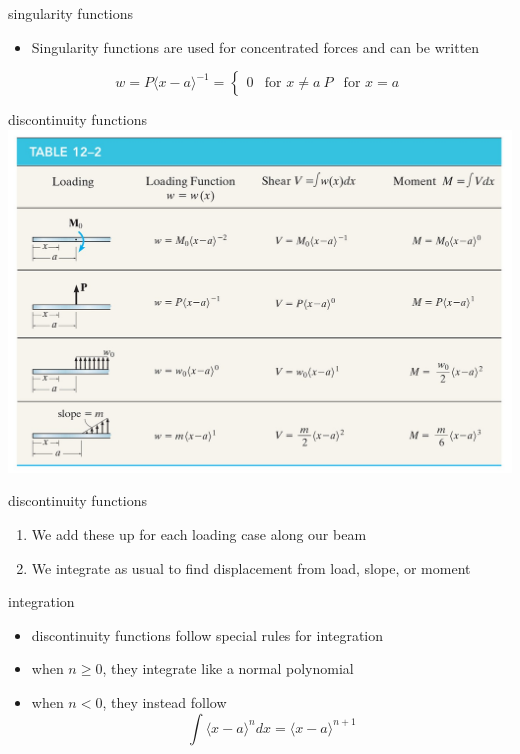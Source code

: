 \documentclass[
  letterpaper,
  ignorenonframetext,
  aspectratio=43,
  handout,
  12pt]{beamer}
\providecommand{\tightlist}{%
  \setlength{\itemsep}{0pt}\setlength{\parskip}{0pt}}
\providecommand{\tightlist}{%
\setlength{\itemsep}{0pt}\setlength{\parskip}{0pt}}
\let\Oldincludegraphics\includegraphics
\renewcommand{\includegraphics}[2][]{\Oldincludegraphics[width=\textwidth,height=0.7\textheight,keepaspectratio]{#2}}
\begin{document}
\begin{frame}{singularity functions}
\protect\hypertarget{singularity-functions}{}
\begin{itemize}
\tightlist
\item
  Singularity functions are used for concentrated forces and can be
  written
\end{itemize}

\[w = P\langle x-a\rangle^{-1} = \begin{cases}
  0 & \text{for } x\ne a\
  P & \text{for } x=a
\end{cases}\]
\end{frame}

\begin{frame}{discontinuity functions}
\protect\hypertarget{discontinuity-functions-1}{}
\includegraphics{../images/discontinuity.jpg}
\end{frame}

\begin{frame}{discontinuity functions}
\protect\hypertarget{discontinuity-functions-2}{}
\begin{enumerate}
\tightlist
\item
  We add these up for each loading case along our beam
\item
  We integrate as usual to find displacement from load, slope, or moment
\end{enumerate}
\end{frame}

\begin{frame}{integration}
\protect\hypertarget{integration}{}
\begin{itemize}
\tightlist
\item
  discontinuity functions follow special rules for integration
\item
  when \(n \ge 0\), they integrate like a normal polynomial
\item
  when \(n < 0\), they instead follow
  \[ \int \langle x-a \rangle ^n dx = \langle x - a \rangle ^{n+1} \]
\end{itemize}
\end{frame}
\end{document}
